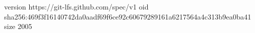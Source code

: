 version https://git-lfs.github.com/spec/v1
oid sha256:469f3f16140742da0aadf69f6ce92c60679289161a6217564a4c313b9ea0ba41
size 2005
